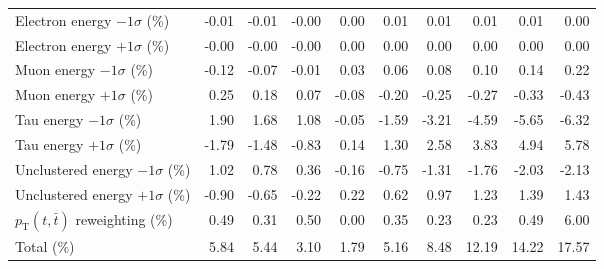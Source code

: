 \begin{table}[htbp]
{\begin{tabular}{lrrrrrrrrr}
Electron energy $-1\sigma$ (\%) & -0.01 & -0.01 & -0.00 & 0.00 & 0.01 & 0.01 & 0.01 & 0.01 & 0.00 \\ 
Electron energy $+1\sigma$ (\%) & -0.00 & -0.00 & -0.00 & 0.00 & 0.00 & 0.00 & 0.00 & 0.00 & 0.00 \\ 
Muon energy $-1\sigma$ (\%) & -0.12 & -0.07 & -0.01 & 0.03 & 0.06 & 0.08 & 0.10 & 0.14 & 0.22 \\ 
Muon energy $+1\sigma$ (\%) & 0.25 & 0.18 & 0.07 & -0.08 & -0.20 & -0.25 & -0.27 & -0.33 & -0.43 \\ 
Tau energy $-1\sigma$ (\%) & 1.90 & 1.68 & 1.08 & -0.05 & -1.59 & -3.21 & -4.59 & -5.65 & -6.32 \\ 
Tau energy $+1\sigma$ (\%) & -1.79 & -1.48 & -0.83 & 0.14 & 1.30 & 2.58 & 3.83 & 4.94 & 5.78 \\ 
Unclustered energy $-1\sigma$ (\%) & 1.02 & 0.78 & 0.36 & -0.16 & -0.75 & -1.31 & -1.76 & -2.03 & -2.13 \\ 
Unclustered energy $+1\sigma$ (\%) & -0.90 & -0.65 & -0.22 & 0.22 & 0.62 & 0.97 & 1.23 & 1.39 & 1.43 \\ 
$p_\mathrm{T}(t,\bar{t})$ reweighting (\%) & 0.49 & 0.31 & 0.50 & 0.00 & 0.35 & 0.23 & 0.23 & 0.49 & 6.00 \\ 
\hline 
Total (\%) & 5.84  & 5.44  & 3.10  & 1.79  & 5.16  & 8.48  & 12.19  & 14.22  & 17.57 \\ 
\hline 
\end{tabular}
}
\end{table}
